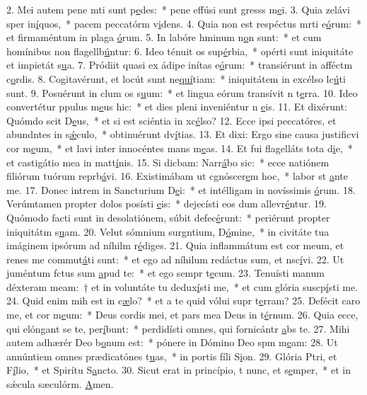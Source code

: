 2. Mei autem pene mti sunt p\uline{e}des:~* pene effúsi sunt gresss m\uline{e}i.
3. Quia zelávi sper in\uline{í}quos,~* pacem peccatórm v\uline{i}dens.
4. Quia non est respéctus mrti e\uline{ó}rum:~* et firmaméntum in plaga \uline{ó}rum.
5. In labóre hminum n\uline{o}n sunt:~* et cum homínibus non flagellb\uline{ú}ntur:
6. Ideo ténuit os sup\uline{é}rbia,~* opérti sunt iniquitáte et impietát s\uline{u}a.
7. Pródiit quasi ex ádipe inítas e\uline{ó}rum:~* transiérunt in afféctm c\uline{o}rdis.
8. Cogitavérunt, et locút sunt ne\uline{quí}tiam:~* iniquitátem in excélso lc\uline{ú}ti sunt.
9. Posuérunt in clum os s\uline{u}um:~* et lingua eórum transívit n t\uline{e}rra.
10. Ideo convertétur ppulus m\uline{e}us hic:~* et dies pleni inveniéntur n \uline{e}is.
11. Et dixérunt: Quómdo scit D\uline{e}us,~* et si est sciéntia in xc\uline{é}lso?
12. Ecce ipsi peccatóres, et abundntes in s\uline{ǽ}culo,~* obtinuérunt dv\uline{í}tias.
13. Et dixi: Ergo sine causa justificvi cor m\uline{e}um,~* et lavi inter innocéntes mans m\uline{e}as.
14. Et fui flagelláts tota d\uline{i}e,~* et castigátio mea in matt\uline{í}nis.
15. Si dicbam: Narr\uline{á}bo sic:~* ecce natiónem filiórum tuórum reprb\uline{á}vi.
16. Existimábam ut cgnóscer\uline{e}m hoc,~* labor st \uline{a}nte me.
17. Donec intrem in Sancturium D\uline{e}i:~* et intélligam in novíssimis \uline{ó}rum.
18. Verúmtamen propter dolos posísti \uline{e}is:~* dejecísti eos dum allevr\uline{é}ntur.
19. Quómodo facti sunt in desolatiónem, súbit defec\uline{é}runt:~* periérunt propter iniquitátm s\uline{u}am.
20. Velut sómnium surgntium, D\uline{ó}mine,~* in civitáte tua imáginem ipsórum ad níhilm r\uline{é}diges.
21. Quia inflammátum est cor meum, et renes me commut\uline{á}ti sunt:~* et ego ad níhilum redáctus sum, et nsc\uline{í}vi.
22. Ut juméntum fctus sum \uline{a}pud te:~* et ego sempr t\uline{e}cum.
23. Tenuísti manum déxteram meam:~† et in voluntáte tu dedux\uline{í}sti me,~* et cum glória suscp\uline{í}sti me.
24. Quid enim mih est in c\uline{æ}lo?~* et a te quid vólui supr t\uline{e}rram?
25. Defécit caro me, et cor m\uline{e}um:~* Deus cordis mei, et pars mea Deus in t\uline{é}rnum.
26. Quia ecce, qui elóngant se  te, per\uline{í}bunt:~* perdidísti omnes, qui fornicántr \uline{a}bs te.
27. Mihi autem adhærér Deo b\uline{o}num est:~* pónere in Dómino Deo spm m\uline{e}am:
28. Ut annúntiem omnes prædicatónes t\uline{u}as,~* in portis fíli S\uline{i}on.
29. Glória Ptri, et F\uline{í}lio,~* et Spirítu S\uline{a}ncto.
30. Sicut erat in princípio, t nunc, et s\uline{e}mper,~* et in sǽcula sæculórm. \uline{A}men.

